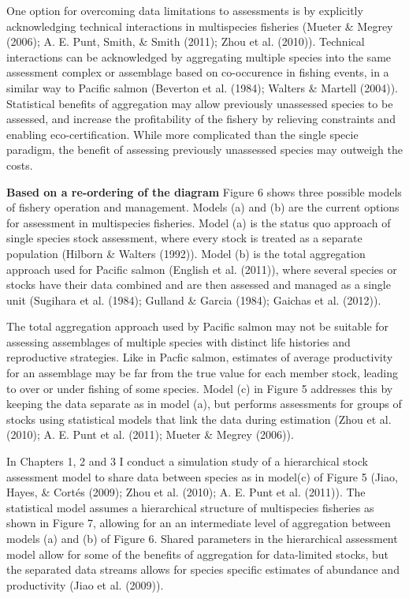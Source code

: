 \documentclass[12pt,]{scrartcl}
\begin{document}
One option for overcoming data limitations to assessments is by
explicitly acknowledging technical interactions in multispecies
fisheries (Mueter \& Megrey (2006); A. E. Punt, Smith, \& Smith (2011);
Zhou et al. (2010)). Technical interactions can be acknowledged by
aggregating multiple species into the same assessment complex or
assemblage based on co-occurence in fishing events, in a similar way to
Pacific salmon (Beverton et al. (1984); Walters \& Martell (2004)).
Statistical benefits of aggregation may allow previously unassessed
species to be assessed, and increase the profitability of the fishery by
relieving constraints and enabling eco-certification. While more
complicated than the single specie paradigm, the benefit of assessing
previously unassessed species may outweigh the costs.

\textbf{Based on a re-ordering of the diagram} Figure 6 shows three
possible models of fishery operation and management. Models (a) and (b)
are the current options for assessment in multispecies fisheries. Model
(a) is the status quo approach of single species stock assessment, where
every stock is treated as a separate population (Hilborn \& Walters
(1992)). Model (b) is the total aggregation approach used for Pacific
salmon (English et al. (2011)), where several species or stocks have
their data combined and are then assessed and managed as a single unit
(Sugihara et al. (1984); Gulland \& Garcia (1984); Gaichas et al.
(2012)).

The total aggregation approach used by Pacific salmon may not be
suitable for assessing assemblages of multiple species with distinct
life histories and reproductive strategies. Like in Pacfic salmon,
estimates of average productivity for an assemblage may be far from the
true value for each member stock, leading to over or under fishing of
some species. Model (c) in Figure 5 addresses this by keeping the data
separate as in model (a), but performs assessments for groups of stocks
using statistical models that link the data during estimation (Zhou et
al. (2010); A. E. Punt et al. (2011); Mueter \& Megrey (2006)).

In Chapters 1, 2 and 3 I conduct a simulation study of a hierarchical
stock assessment model to share data between species as in model(c) of
Figure 5 (Jiao, Hayes, \& Cortés (2009); Zhou et al. (2010); A. E. Punt
et al. (2011)). The statistical model assumes a hierarchical structure
of multispecies fisheries as shown in Figure 7, allowing for an an
intermediate level of aggregation between models (a) and (b) of Figure
6. Shared parameters in the hierarchical assessment model allow for some
of the benefits of aggregation for data-limited stocks, but the
separated data streams allows for species specific estimates of
abundance and productivity (Jiao et al. (2009)).
\end{document}

